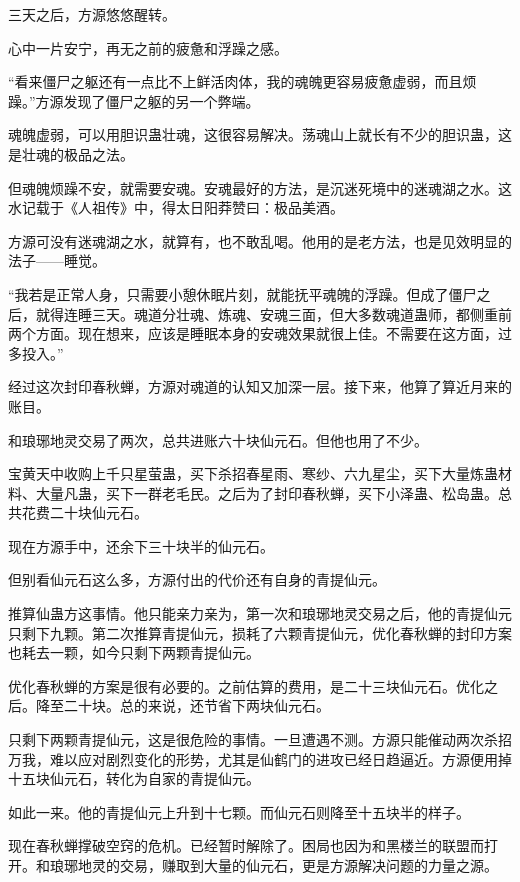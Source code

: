 
\begin{this_body}

三天之后，方源悠悠醒转。

心中一片安宁，再无之前的疲惫和浮躁之感。

“看来僵尸之躯还有一点比不上鲜活肉体，我的魂魄更容易疲惫虚弱，而且烦躁。”方源发现了僵尸之躯的另一个弊端。

魂魄虚弱，可以用胆识蛊壮魂，这很容易解决。荡魂山上就长有不少的胆识蛊，这是壮魂的极品之法。

但魂魄烦躁不安，就需要安魂。安魂最好的方法，是沉迷死境中的迷魂湖之水。这水记载于《人祖传》中，得太日阳莽赞曰：极品美酒。

方源可没有迷魂湖之水，就算有，也不敢乱喝。他用的是老方法，也是见效明显的法子——睡觉。

“我若是正常人身，只需要小憩休眠片刻，就能抚平魂魄的浮躁。但成了僵尸之后，就得连睡三天。魂道分壮魂、炼魂、安魂三面，但大多数魂道蛊师，都侧重前两个方面。现在想来，应该是睡眠本身的安魂效果就很上佳。不需要在这方面，过多投入。”

经过这次封印春秋蝉，方源对魂道的认知又加深一层。接下来，他算了算近月来的账目。

和琅琊地灵交易了两次，总共进账六十块仙元石。但他也用了不少。

宝黄天中收购上千只星萤蛊，买下杀招春星雨、寒纱、六九星尘，买下大量炼蛊材料、大量凡蛊，买下一群老毛民。之后为了封印春秋蝉，买下小泽蛊、松岛蛊。总共花费二十块仙元石。

现在方源手中，还余下三十块半的仙元石。

但别看仙元石这么多，方源付出的代价还有自身的青提仙元。

推算仙蛊方这事情。他只能亲力亲为，第一次和琅琊地灵交易之后，他的青提仙元只剩下九颗。第二次推算青提仙元，损耗了六颗青提仙元，优化春秋蝉的封印方案也耗去一颗，如今只剩下两颗青提仙元。

优化春秋蝉的方案是很有必要的。之前估算的费用，是二十三块仙元石。优化之后。降至二十块。总的来说，还节省下两块仙元石。

只剩下两颗青提仙元，这是很危险的事情。一旦遭遇不测。方源只能催动两次杀招万我，难以应对剧烈变化的形势，尤其是仙鹤门的进攻已经日趋逼近。方源便用掉十五块仙元石，转化为自家的青提仙元。

如此一来。他的青提仙元上升到十七颗。而仙元石则降至十五块半的样子。

现在春秋蝉撑破空窍的危机。已经暂时解除了。困局也因为和黑楼兰的联盟而打开。和琅琊地灵的交易，赚取到大量的仙元石，更是方源解决问题的力量之源。


\end{this_body}
